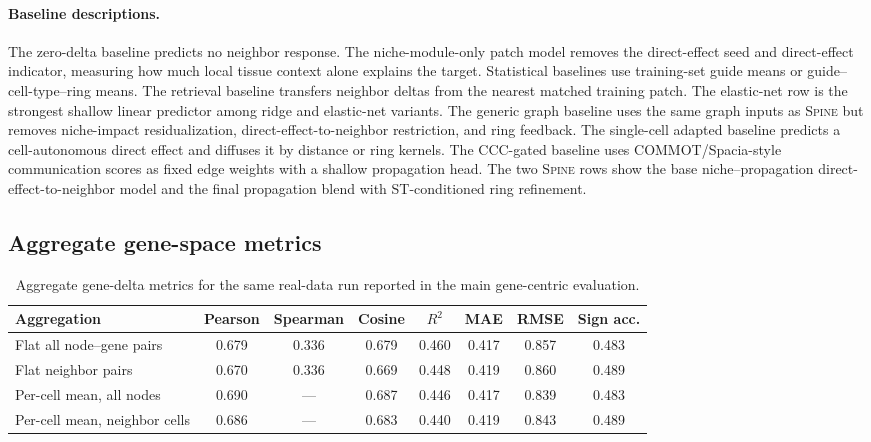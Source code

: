 \documentclass[sigconf,anonymous,review]{acmart}
\newcommand{\methodname}{\textsc{Spine}\xspace}
\begin{document}
\paragraph{Baseline descriptions.}
The zero-delta baseline predicts no neighbor response. The niche-module-only patch model removes the direct-effect seed and direct-effect indicator, measuring how much local tissue context alone explains the target. Statistical baselines use training-set guide means or guide--cell-type--ring means. The retrieval baseline transfers neighbor deltas from the nearest matched training patch. The elastic-net row is the strongest shallow linear predictor among ridge and elastic-net variants. The generic graph baseline uses the same graph inputs as \methodname{} but removes niche-impact residualization, direct-effect-to-neighbor restriction, and ring feedback. The single-cell adapted baseline predicts a cell-autonomous direct effect and diffuses it by distance or ring kernels. The CCC-gated baseline uses COMMOT/Spacia-style communication scores as fixed edge weights with a shallow propagation head. The two \methodname{} rows show the base niche--propagation direct-effect-to-neighbor model and the final propagation blend with ST-conditioned ring refinement.

\subsection{Aggregate gene-space metrics}
\label{app:gene_space_metrics}

\begin{table}[t]
\centering
\caption{Aggregate gene-delta metrics for the same real-data run reported in the main gene-centric evaluation.}
\label{tab:app_gene_delta_metrics}
\small
\setlength{\tabcolsep}{5pt}
\renewcommand{\arraystretch}{1.12}
\begin{tabular}{lccccccc}
\toprule
Aggregation & Pearson & Spearman & Cosine & $R^2$ & MAE & RMSE & Sign acc. \\
\midrule
Flat all node--gene pairs & 0.679 & 0.336 & 0.679 & 0.460 & 0.417 & 0.857 & 0.483 \\
Flat neighbor pairs & 0.670 & 0.336 & 0.669 & 0.448 & 0.419 & 0.860 & 0.489 \\
Per-cell mean, all nodes & 0.690 & --- & 0.687 & 0.446 & 0.417 & 0.839 & 0.483 \\
Per-cell mean, neighbor cells & 0.686 & --- & 0.683 & 0.440 & 0.419 & 0.843 & 0.489 \\
\bottomrule
\end{tabular}
\end{table}
\end{document}
